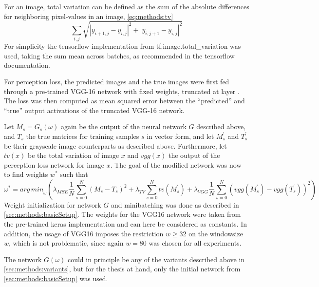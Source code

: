 For an image, total variation can be defined as the sum of the absolute differences for neighboring pixel-values in an image, \cref{eq:methods:tv} \cite{Rudin1992}
\begin{equation}
 \sum_{i,j}\sqrt{|y_{i+1,j} - y_{i,j}|^2 + |y_{i,j+1} - y_{i,j} |^2 } \label{eq:methods:tv}
\end{equation}
For simplicity the tensorflow implementation from tf.image.total\_variation was used,
taking the \xxx sum \xxx mean across batches, as recommended in the tensorflow documentation.

For perception loss, the predicted images and the true images were first fed through a pre-trained VGG-16 network with fixed weights, truncated at layer \xxx.
The loss was then computed as mean squared error between the ``predicted'' and ``true'' output activations of the truncated VGG-16 network.

Let $M_s=G_s(\omega)$ again be the output of the neural network $G$ described above, and $T_s$ the true matrices for training samples $s$ in vector form,
and let $M^\prime_s$ and $T^\prime_s$ be their grayscale image counterparts as described above.
Furthermore, let $\mathit{tv}(x)$ be the total variation of image $x$ and $\mathit{vgg}(x)$ the output of the perception loss network for image $x$.
The goal of the modified network was now to find weights $w^*$ such that
\begin{equation}
 \omega^* = \mathit{arg\,min}_\omega (  \lambda_\mathit{MSE} \frac{1}{N} \sum_{s=0}^N (M_s - T_s)^2 
                                                     + \lambda_\mathit{TV} \sum_{s=0}^N \mathit{tv}( M^\prime_s) 
                                                     + \lambda_\mathit{VGG} \frac{1}{N} \sum_{s=0}^N (\mathit{vgg}(M^\prime_s) - \mathit{vgg}(T^\prime_s))^2 ) \label{eq:methods:combined_loss}
\end{equation}
Weight initialization for network $G$ and minibatching was done as described in \cref{sec:methods:basicSetup}.
The weights for the VGG16 network were taken from the pre-trained keras implementation and can here be considered as constants.
In addition, the usage of VGG16 imposes the restriction $w \geq 32$ on the windowsize $w$, which is not problematic, since again $w=80$ was chosen for all experiments.

The network $G(\omega)$ could in principle be any of the variants described above in \cref{sec:methods:variants},
but for the thesis at hand, only the initial network from \cref{sec:methods:basicSetup} was used.

